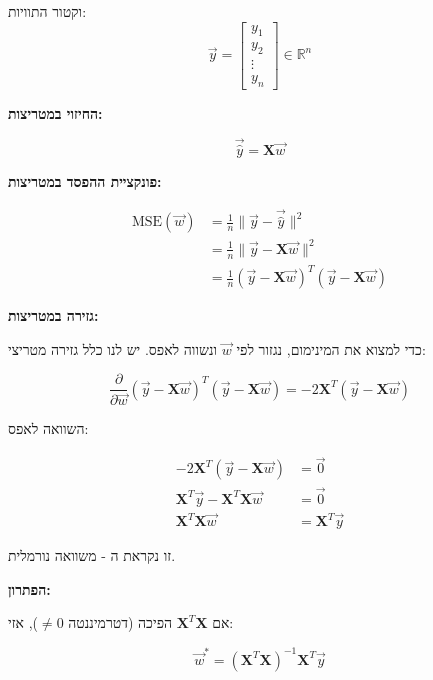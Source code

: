וקטור התוויות:
\begin{equation}
\vec{y} = \begin{bmatrix} y_1 \\ y_2 \\ \vdots \\ y_n \end{bmatrix} \in \mathbb{R}^{n}
\end{equation}

\textbf{החיזוי במטריצות:}

\begin{equation}
\vec{\hat{y}} = \mathbf{X}\vec{w}
\end{equation}

\textbf{פונקציית ההפסד במטריצות:}

\begin{align}
\text{MSE}(\vec{w}) &= \frac{1}{n} \|\vec{y} - \vec{\hat{y}}\|^2 \nonumber \\
&= \frac{1}{n} \|\vec{y} - \mathbf{X}\vec{w}\|^2 \nonumber \\
&= \frac{1}{n} (\vec{y} - \mathbf{X}\vec{w})^T(\vec{y} - \mathbf{X}\vec{w})
\end{align}

\textbf{גזירה במטריצות:}

כדי למצוא את המינימום, נגזור לפי $\vec{w}$ ונשווה לאפס. יש לנו כלל גזירה מטריצי:

\begin{equation}
\frac{\partial}{\partial \vec{w}} (\vec{y} - \mathbf{X}\vec{w})^T(\vec{y} - \mathbf{X}\vec{w}) = -2\mathbf{X}^T(\vec{y} - \mathbf{X}\vec{w})
\end{equation}

השוואה לאפס:

\begin{align}
-2\mathbf{X}^T(\vec{y} - \mathbf{X}\vec{w}) &= \vec{0} \nonumber \\
\mathbf{X}^T\vec{y} - \mathbf{X}^T\mathbf{X}\vec{w} &= \vec{0} \nonumber \\
\mathbf{X}^T\mathbf{X}\vec{w} &= \mathbf{X}^T\vec{y}
\end{align}

זו נקראת ה\textbf{} - משוואה נורמלית.

\textbf{הפתרון:}

אם $\mathbf{X}^T\mathbf{X}$ הפיכה (דטרמיננטה $\neq 0$), אזי:

\begin{equation}
\vec{w}^* = (\mathbf{X}^T\mathbf{X})^{-1}\mathbf{X}^T\vec{y}
\end{equation}

